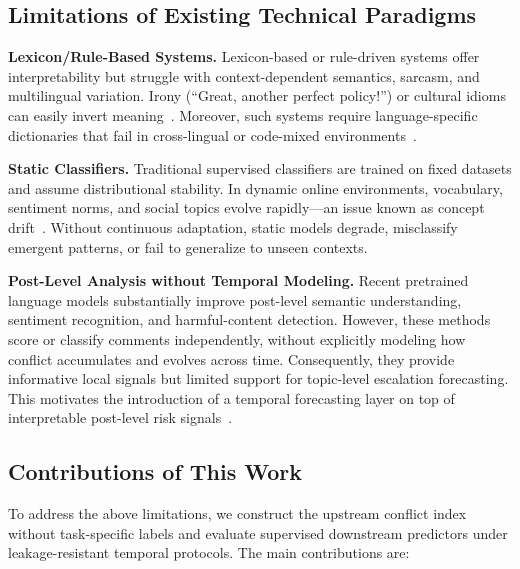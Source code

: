 \documentclass[11pt,a4paper]{article}
\begin{document}
\subsection{Limitations of Existing Technical Paradigms}

\textbf{Lexicon/Rule-Based Systems.} Lexicon-based or rule-driven systems offer interpretability but struggle with context-dependent semantics, sarcasm, and multilingual variation. Irony (``Great, another perfect policy!'') or cultural idioms can easily invert meaning~\cite{Dhumpati2025}. Moreover, such systems require language-specific dictionaries that fail in cross-lingual or code-mixed environments~\cite{Kaity2020}.

\textbf{Static Classifiers.} Traditional supervised classifiers are trained on fixed datasets and assume distributional stability. In dynamic online environments, vocabulary, sentiment norms, and social topics evolve rapidly---an issue known as concept drift~\cite{Gama2014}. Without continuous adaptation, static models degrade, misclassify emergent patterns, or fail to generalize to unseen contexts.

\textbf{Post-Level Analysis without Temporal Modeling.} Recent pretrained language models substantially improve post-level semantic understanding, sentiment recognition, and harmful-content detection. However, these methods score or classify comments independently, without explicitly modeling how conflict accumulates and evolves across time. Consequently, they provide informative local signals but limited support for topic-level escalation forecasting. This motivates the introduction of a temporal forecasting layer on top of interpretable post-level risk signals~\cite{Abdalgader2025}.

\subsection{Contributions of This Work}

To address the above limitations, we construct the upstream conflict index without task-specific labels and evaluate supervised downstream predictors under leakage-resistant temporal protocols. The main contributions are:
\end{document}
